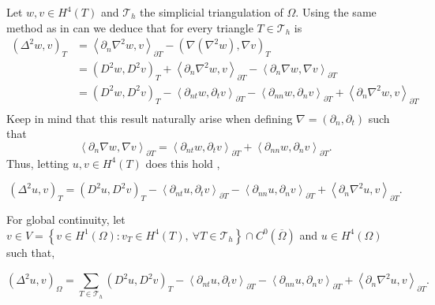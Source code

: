 Let $w,v \in  H^{4} \left( T  \right) $ and $\mathcal{T}_{h} $ the simplicial triangulation of $\Omega$. Using the same method as in \cite{gu2012c0, brenner2012quadratic} can we
deduce that for every triangle $T \in  \mathcal{T}_{h} $ is \[
    \begin{split}
        \left( \Delta  ^{2} w, v \right) _{T} &= \left< \partial _{n} \nabla ^2 w, v \right>_{\partial T} - \left( \nabla \left( \nabla ^2 w
 \right), \nabla  v  \right)_{T}   \\
 &= \left( D^2w, D^2v \right)_{T} + \left< \partial _{n} \nabla ^2 w, v \right>_{\partial T}  - \left<\partial _{n}
 \nabla w, \nabla v \right>_{\partial T} \\
 &=  \left( D^2 w, D^2 v \right)_{T} - \left<\partial _{nt} w, \partial _{t} v \right>_{\partial T} - \left<\partial
 _{nn} w, \partial _{n} v \right> _{\partial T} +  \left<\partial _{n} \nabla ^2 w, v \right>_{\partial T} \\
    \end{split}
\]
Keep in mind that this result naturally arise when defining $\nabla  = \left( \partial _{n}, \partial _{t} \right) $ such that
\[
\left<\partial _{n} \nabla w, \nabla v \right>_{\partial T} = \left<\partial _{nt} w, \partial _{t} v\right> _{\partial
T} + \left< \partial _{nn} w, \partial _{n} v  \right> _{\partial T} .
\]
 Thus, letting $u,v \in
H^{4}\left( T  \right) $  does this hold ,

\begin{equation}
\label{eq:bi_basic_dg}
\left( \Delta  ^{2} u,v \right) _{T} =  \left( D^2u,D^2v \right) _{T } - \left<\partial _{nt} u, \partial _{t}v
\right>_{\partial T} - \left<\partial _{nn} u, \partial _{n}v \right>_{\partial T} + \left<\partial _{n} \nabla ^2 u,v
\right>_{\partial T}
.\end{equation}

For global continuity, let  $v \in V =  \left\{ v \in H^{1}\left( \Omega  \right): v_{T} \in  H^{4}\left( T \right), \ \forall T \in
\mathcal{T}_{h}    \right\}   \cap C^{0} (
\overline{\Omega }  ) $ and $u \in  H^{4}\left( \Omega  \right) $ such that,

\begin{equation}
\label{eq:bi_basic_dg2}
\left( \Delta  ^{2} u,v \right) _{\Omega } = \sum_{T \in  \mathcal{T} _{h}}^{} \left( D^2u,D^2v \right) _{T } - \left<\partial _{nt} u, \partial _{t}v
\right>_{\partial T} - \left<\partial _{nn} u, \partial _{n}v \right>_{\partial T} + \left<\partial _{n} \nabla ^2 u,v
\right>_{\partial T}
.\end{equation}

